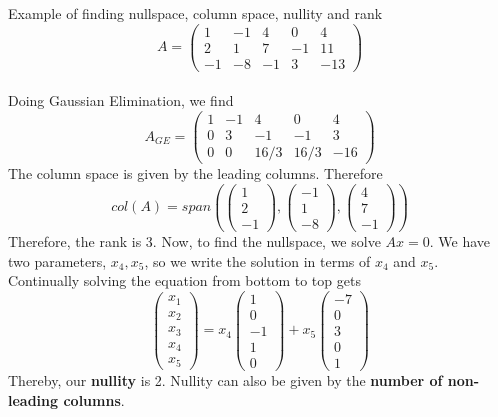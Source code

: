 \documentclass[journal, letterpaper]{IEEEtran}
\begin{document}
    \begin{myboxg}{Example of finding nullspace, column space, nullity and rank} \\ 
        $$ A = \begin{pmatrix}
            1 & -1 & 4 & 0 & 4 \\ 
            2 & 1 & 7 & -1 & 11 \\
            -1 & -8 & -1 & 3 & -13
        \end{pmatrix}$$
        \newline \\
        Doing Gaussian Elimination, we find
        $$
        A_{GE} = \begin{pmatrix}
            1 & -1 & 4 & 0 & 4 \\
            0 & 3 & -1 & -1 & 3 \\
            0 & 0 & 16/3 & 16/3 & -16
        \end{pmatrix}
        $$
        The column space is given by the leading columns. Therefore
        $$ col(A) = span\left(\begin{pmatrix}
            1 \\ 2 \\ -1
        \end{pmatrix}, \begin{pmatrix}
            -1 \\ 1 \\ -8
        \end{pmatrix}, \begin{pmatrix}
            4 \\ 7 \\ -1
        \end{pmatrix}\right)$$
        Therefore, the rank is 3. Now, to find the nullspace, we solve $Ax = 0$. We have two parameters, $x_4, x_5$, so we write the solution in terms of $x_4$ and $x_5$. Continually solving the equation from bottom to top gets
        $$
        \begin{pmatrix}
            x_1 \\ x_2 \\ x_3 \\ x_4 \\ x_5
        \end{pmatrix} = x_4\begin{pmatrix}
            1 \\ 0 \\ -1 \\ 1 \\ 0
        \end{pmatrix} + x_5 \begin{pmatrix}
            -7 \\ 0 \\ 3 \\ 0 \\ 1
        \end{pmatrix}
        $$
        Thereby, our \textbf{nullity} is 2. Nullity can also be given by the \textbf{number of non-leading columns}.
    \end{myboxg}
\end{document}
